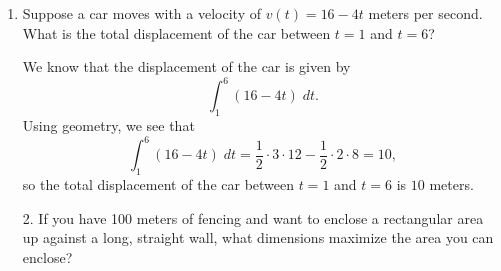 \documentclass[11pt]{article}
\begin{document}
\pagestyle{empty}
\newsavebox{\quizfront}
\begin{lrbox}{\quizfront}
\begin{minipage}[top][4.5in][t]{\textwidth} \setlength{\parindent}{1.5em}
\drawtitle
\vspace{-0.5in}
\begin{enumerate}

\item Suppose a car moves with a velocity of $v(t) = 16 - 4t$ meters
  per second.  What is the total displacement of the car between $t =
  1$ and $t = 6$?

    \vfill
    {\color{blue}
      
      We know that the displacement of the car is given by
      \[
      \int_1^6 (16-4t)\; dt.
      \]
      Using geometry, we see that
      \[
      \int_1^6 (16-4t)\; dt = \frac{1}{2}\cdot 3\cdot 12 -
      \frac{1}{2}\cdot 2\cdot 8 = 10,
      \]
      so the total displacement of the car between $t=1$ and $t=6$ is
      $10$ meters.
      
    }
  \vfill

\end{enumerate}


\end{minipage}
\end{lrbox}

\newsavebox{\quizback}
\begin{lrbox}{\quizback}
\begin{minipage}[top][4.5in][t]{\textwidth} \setlength{\parindent}{1.5em}
\begin{enumerate}
\item[2.] If you have 100 meters of fencing and want to enclose a
  rectangular area up against a long, straight wall, what dimensions
  maximize the area you can enclose?

\end{enumerate}
\end{minipage}
\end{lrbox}

\noindent \usebox{\quizfront}
\vfill

\end{document}
